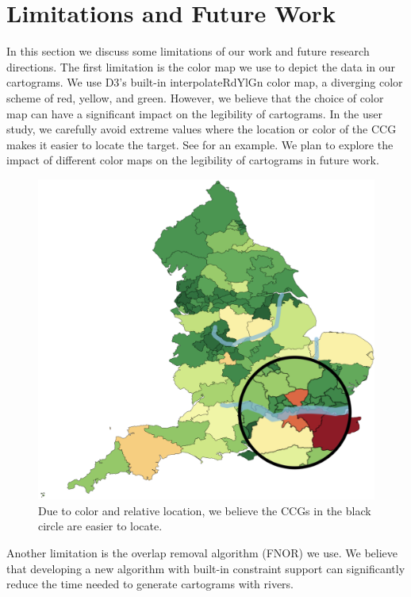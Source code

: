 \section{Limitations and Future Work}

In this section we discuss some limitations of our work and future research directions. The first limitation is the color map we use to depict the data in our cartograms. We use D3's built-in interpolateRdYlGn color map, a diverging color scheme of red, yellow, and green. However, we believe that the choice of color map can have a significant impact on the legibility of cartograms. In the user study, we carefully avoid extreme values where the location or color of the CCG makes it easier to locate the target. See  for an example. We plan to explore the impact of different color maps on the legibility of cartograms in future work.

{
    \begin{figure}[tb!]
        \centering
        \includegraphics[width=\columnwidth,keepaspectratio]{figure/limitations/extreme.png}
        \caption{Due to color and relative location, we believe the CCGs in the black circle are easier to locate.}
        \label{fig:extreme}
    \end{figure}
}

Another limitation is the overlap removal algorithm (FNOR) we use. We believe that developing a new algorithm with built-in constraint support can significantly reduce the time needed to generate cartograms with rivers.
